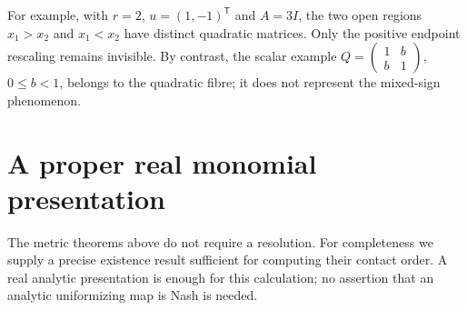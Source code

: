 \documentclass[11pt,reqno]{amsart}
\numberwithin{equation}{section}
\theoremstyle{definition}
\theoremstyle{remark}
\begin{document}
For example, with $r=2$, $u=(1,-1)^{\mathsf T}$ and $A=3I$, the two open regions $x_1>x_2$ and $x_1<x_2$ have distinct quadratic matrices. Only the positive endpoint rescaling remains invisible. By contrast, the scalar example $Q=\left(\begin{smallmatrix}1&b\\b&1\end{smallmatrix}\right)$, $0\le b<1$, belongs to the quadratic fibre; it does not represent the mixed-sign phenomenon.

\appendix
\section{A proper real monomial presentation}\label{app:real}
The metric theorems above do not require a resolution. For completeness we supply a precise existence result sufficient for computing their contact order. A real analytic presentation is enough for this calculation; no assertion that an analytic uniformizing map is Nash is needed.
\end{document}
